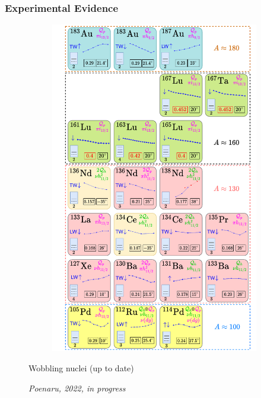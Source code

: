 \documentclass{beamer}
\begin{document}
\begin{frame}
  \frametitle{Experimental Evidence}
  \begin{figure}
    \centering
    \begin{minipage}{.5\textwidth}
      \begin{figure}
        \centering
        \includegraphics[scale=0.22]{Figs/wobblers-chart.pdf}
      \end{figure}
    \end{minipage}%
    \begin{minipage}{.5\textwidth}
      \par Wobbling nuclei (up to date)
      \par \textit{Poenaru, 2022, in progress}
    \end{minipage}
    \end{figure}
\end{frame}
\end{document}
